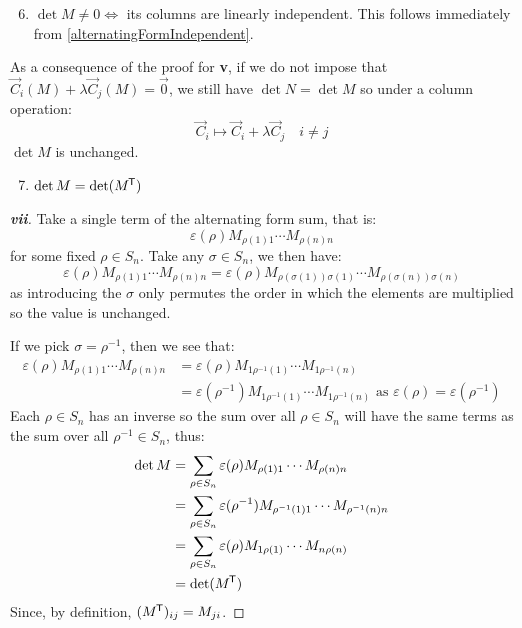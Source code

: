 \documentclass[../main.tex]{subfiles}
\begin{document}
\begin{enumerate}
  \setcounter{enumi}{5}
  \item $\det M \neq 0 \iff$ its columns are linearly independent.
    This follows immediately from \cref{alternatingFormIndependent}.
\end{enumerate}
\begin{remark}
  As a consequence of the proof for \textbf{v}, if we do not impose that $\vec{C}_i(M) + \lambda \vec{C}_j(M) = \vec{0}$, we still have $\det N = \det M$ so under a column operation:
  \[
    \vec{C}_i \mapsto \vec{C}_i + \lambda \vec{C}_j \quad i \neq j
  \]
  $\det M$ is unchanged.
\end{remark}
\begin{enumerate}
  \setcounter{enumi}{6}
  \item $\det M = \det(M^{{\mkern-1.5mu\mathsf{T}}})$
\end{enumerate}
\begin{proof}[\textbf{vii}]
  Take a single term of the alternating form sum, that is:
  \[
    \varepsilon(\rho)M_{\rho(1) 1} \cdots M_{\rho(n) n}
  \]
  for some fixed $\rho \in S_n$.
  Take any $\sigma \in S_n$, we then have:
  \[
    \varepsilon(\rho) M_{\rho(1) 1} \cdots M_{\rho(n) n} = \varepsilon(\rho) M_{\rho(\sigma(1)) \sigma(1)} \cdots M_{\rho(\sigma(n)) \sigma(n)}
  \]
  as introducing the $\sigma$ only permutes the order in which the elements are multiplied so the value is unchanged.

  If we pick $\sigma = \rho^{-1}$, then we see that:
  \begin{align*}
    \varepsilon(\rho) M_{\rho(1) 1} \cdots M_{\rho(n) n} &= \varepsilon(\rho) M_{1 \rho^{-1}(1)} \cdots M_{1 \rho^{-1}(n)} \\
                                                         &= \varepsilon(\rho^{-1}) M_{1 \rho^{-1}(1)} \cdots M_{1 \rho^{-1}(n)} \text{ as $\varepsilon(\rho) = \varepsilon(\rho^{-1})$}
  \end{align*}
  Each $\rho \in S_n$ has an inverse so the sum over all $\rho \in S_n$ will have the same terms as the sum over all $\rho^{-1} \in S_n$, thus:
  \begin{align*}
    \det M &= \sum_{\rho \in S_n} \varepsilon(\rho) M_{\rho(1) 1} \cdots M_{\rho(n) n} \\
           &= \sum_{\rho \in S_n} \varepsilon(\rho^{-1}) M_{\rho^{-1}(1) 1} \cdots M_{\rho^{-1}(n) n} \\
           &= \sum_{\rho \in S_n} \varepsilon(\rho) M_{1 \rho(1)} \cdots M_{n \rho(n)} \\
           &= \det(M^{{\mkern-1.5mu\mathsf{T}}})
  \end{align*}
  Since, by definition, $(M^{{\mkern-1.5mu\mathsf{T}}})_{i j} = M_{j i}$.
\end{proof}
\end{document}
